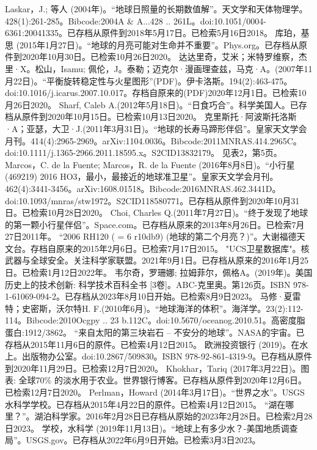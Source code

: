 \begin{enumerate}
 Laskar，J.; 等人 (2004年)。“地球日照量的长期数值解”。天文学和天体物理学。428(1):261-285。Bibcode:2004A & A...428 .. 261L。doi:10.1051/0004-6361:20041335。已存档从原件到2018年5月17日。已检索5月16日2018。
 库珀，基思 (2015年1月27日)。“地球的月亮可能对生命并不重要”。Phys.org。已存档从原件到2020年10月30日。已检索10月26日2020。
 达达里奇，艾米；米特罗维察，杰里·X。松山，Isamu; 佩伦，J。泰勒；迈克尔·漫画理查兹，马克·A。(2007年11月22日)。“平衡旋转稳定性与火星图形”(PDF)。伊卡洛斯。194(2):463-475。doi:10.1016/j.icarus.2007.10.017。存档自原来的(PDF)2020年12月1日。已检索10月26日2020。
 Sharf, Caleb A.(2012年5月18日)。“日食巧合”。科学美国人。已存档从原件到2020年10月15日。已检索10月13日2020。
 克里斯托·阿波斯托洛斯·A；亚瑟，大卫·J.(2011年3月31日)。“地球的长寿马蹄形伴侣”。皇家天文学会月刊。414(4):2965-2969。arXiv:1104.0036。Bibcode:2011MNRAS.414.2965C。doi:10.1111/j.1365-2966.2011.18595.x。S2CID13832179。 见表2，第5页。
 Marcos，C. de la Fuente; Marcos，R. de la Fuente (2016年8月8日)。“小行星 (469219) 2016 HO3，最小，最接近的地球准卫星”。皇家天文学会月刊。462(4):3441-3456。arXiv:1608.01518。Bibcode:2016MNRAS.462.3441D。doi:10.1093/mnras/stw1972。S2CID118580771。已存档从原件到2020年10月31日。已检索10月28日2020。 
 Choi, Charles Q.(2011年7月27日)。“终于发现了地球的第一颗小行星伴侣”。Space.com。已存档从原来的2013年8月26日。已检索7月27日2011年。
 “2006 RH120 ( = 6 r10db9) (地球的第二个月亮？)”。大谢福德天文台。存档自原来的2015年2月6日。已检索7月17日2015。
 "UCS卫星数据库"。核武器与全球安全。关注科学家联盟。2021年9月1日。已存档从原来的2016年1月25日。已检索1月12日2022年。
 韦尔奇，罗珊娜; 拉姆菲尔，佩格A。(2019年)。美国历史上的技术创新: 科学技术百科全书 [3卷]。ABC-克里奥。第126页。ISBN 978-1-61069-094-2。已存档从2023年8月10日开始。已检索8月9日2023。
 马修·夏雷特；史密斯，沃尔特H. F.(2010年6月)。“地球海洋的体积”。海洋学。23(2):112-114。Bibcode:2010Ocgpy .. 23 b.112C。doi:10.5670/oceanog.2010.51。高密度脂蛋白:1912/3862。
 “来自太阳的第三块岩石 -- 不安分的地球”。NASA的宇宙。已存档从2015年11月6日的原件。已检索4月12日2015。
 欧洲投资银行 (2019)。在水上。出版物办公室。doi:10.2867/509830。ISBN 978-92-861-4319-9。已存档从原件到2020年11月29日。已检索12月7日2020。
 Khokhar，Tariq (2017年3月22日)。图表: 全球70\% 的淡水用于农业。世界银行博客。已存档从原件到2020年12月6日。已检索12月7日2020。
 Perlman，Howard (2014年3月17日)。“世界之水”。USGS水科学学校。已存档从2015年4月22日的原件。已检索4月12日2015。
 “湖在哪里？”。湖泊科学家。2016年2月28日已存档从原始的2023年2月28日。已检索2月28日2023。
 学校，水科学 (2019年11月13日)。“地球上有多少水？-美国地质调查局”。USGS.gov。已存档从2022年6月9日开始。已检索3月3日2023。

\end{enumerate}
